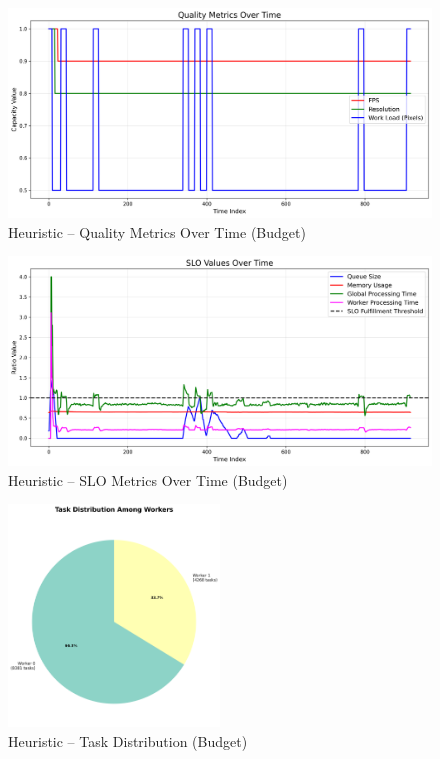 \begin{figure}[h]
    \centering
    \includegraphics[width=\textwidth]{img/results/variable_computational_budget_sim/heuristic_quality_metrics.png}
    \caption{Heuristic – Quality Metrics Over Time (Budget)}
\end{figure}
\begin{figure}[h]
    \centering
    \includegraphics[width=\textwidth]{img/results/variable_computational_budget_sim/heuristic_slo_values.png}
    \caption{Heuristic – SLO Metrics Over Time (Budget)}
\end{figure}
\begin{figure}[h]
    \centering
    \includegraphics[width=0.5\textwidth]{img/results/variable_computational_budget_sim/heuristic_task_distribution_pie.png}
    \caption{Heuristic – Task Distribution (Budget)}
\end{figure}
